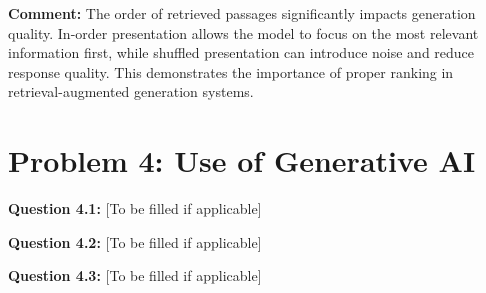 \documentclass[11pt]{article}
\begin{document}
\textbf{Comment:} The order of retrieved passages significantly impacts generation quality. In-order presentation allows the model to focus on the most relevant information first, while shuffled presentation can introduce noise and reduce response quality. This demonstrates the importance of proper ranking in retrieval-augmented generation systems.

\section{Problem 4: Use of Generative AI}

\textbf{Question 4.1:} [To be filled if applicable]

\textbf{Question 4.2:} [To be filled if applicable]

\textbf{Question 4.3:} [To be filled if applicable]
\end{document}

